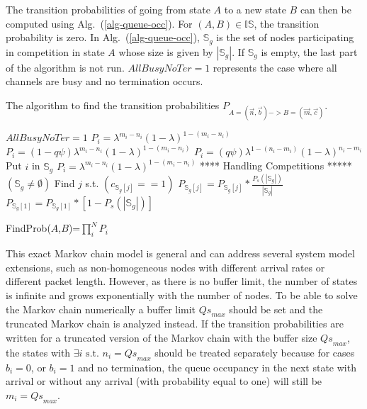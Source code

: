 \documentclass[12pt,journal,oneside,onecolumn]{IEEEtran}
\begin{document}
The transition probabilities of going from state $A$ to a new state $B$ can then be computed using Alg.~({\ref{alg-queue-occ}}). For $(A,B) \in \mathbb{IS}$, the transition probability is zero. 
In Alg.~(\ref{alg-queue-occ}), $\mathbb{S}_g$ is the set of nodes participating in competition in 
state $A$ whose size is given by $|\mathbb{S}_g|$. If $\mathbb{S}_g$ is empty, the last part of the algorithm is not run. $AllBusyNoTer=1$ represents the case where all channels are busy and no termination occurs. 
\begin{algorithm}[H]
\caption{\scriptsize{The algorithm to find the transition probabilities $P_{A=(\vec{n},\vec{b})->B=(\vec{m},\vec{c})}$.}}
\label{alg-queue-occ}
\scriptsize
\begin{algorithmic}
\STATE $AllBusyNoTer=1$
\ENDIF
{}
    \STATE $P_i=\lambda^{m_i-n_i} (1-\lambda)^{1-(m_i-n_i)}$
\ELSE
    					\STATE $P_i=(1-q\psi)\lambda^{m_i-n_i} (1-\lambda)^{1-(m_i-n_i)}$
					 \ELSE
    					\STATE $P_i=(q\psi)\lambda^{1-(n_i-m_i)} (1-\lambda)^{n_i-m_i}$
    			 \ENDIF
\ELSE
    			 \STATE Put $i$ in $\mathbb{S}_g$
    			 \STATE $P_i=\lambda^{m_i-n_i} (1-\lambda)^{1-(m_i-n_i)}$
    \ENDIF
\ENDIF
\ENDFOR
\STATE ***** Handling Competitions ***** $(\mathbb{S}_g \neq \emptyset)$
\STATE Find $j$ s.t.  $(c_{\mathbb{S}_g[j]}==1)$
    	  \STATE $P_{\mathbb{S}_g[j]}=P_{\mathbb{S}_g[j]}* \frac{P_s(|\mathbb{S}_g|)}{|\mathbb{S}_g|}$
    \ELSE
							\STATE $P_{\mathbb{S}_g[1]}=P_{\mathbb{S}_g[1]}* [1-P_s(|\mathbb{S}_g|)]$
				\ENDIF
				
    \ENDIF



 \STATE FindProb($A$,$B$)=$\prod_{i}^{N}{P_i}$
\end{algorithmic}
\end{algorithm}
\normalsize


This exact Markov chain model is general and can address several system model extensions, 
such as non-homogeneous nodes with different arrival rates or different packet length. 
However, as there is no buffer limit, the number of states is infinite and grows exponentially 
with the number of nodes. To be able to solve the Markov chain numerically a buffer limit ${Qs}_{max}$ should be set
and the truncated Markov chain is analyzed instead. 
If the transition probabilities are written for a truncated version of the Markov chain with 
the buffer size ${Qs}_{max}$, the states with $\exists i \mbox{ s.t. } n_i={Qs}_{max}$ should 
be treated separately because for cases $b_i=0$, or $b_i=1$ and no termination, the queue 
occupancy in the next state with arrival or without any arrival (with probability equal to one) will still be $m_i={Qs}_{max}$.
\end{document}
